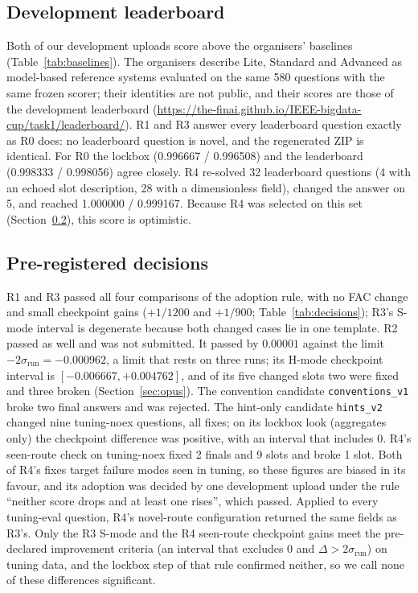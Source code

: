 \documentclass[conference]{IEEEtran}
\newcommand{\id}[1]{\texttt{#1}}
\begin{document}
\subsection{Development leaderboard}
Both of our development uploads score above the organisers' baselines (Table~\ref{tab:baselines}). The organisers describe Lite, Standard and Advanced as model-based reference systems evaluated on the same 580 questions with the same frozen scorer; their identities are not public, and their scores are those of the development leaderboard (\url{https://the-finai.github.io/IEEE-bigdata-cup/task1/leaderboard/}). R1 and R3 answer every leaderboard question exactly as R0 does: no leaderboard question is novel, and the regenerated ZIP is identical. For R0 the lockbox (0.996667 / 0.996508) and the leaderboard (0.998333 / 0.998056) agree closely. R4 re-solved 32 leaderboard questions (4 with an echoed slot description, 28 with a dimensionless field), changed the answer on 5, and reached 1.000000 / 0.999167. Because R4 was selected on this set (Section~\ref{sec:decisions}), this score is optimistic.

\subsection{Pre-registered decisions}\label{sec:decisions}
R1 and R3 passed all four comparisons of the adoption rule, with no FAC change and small checkpoint gains ($+1/1200$ and $+1/900$; Table~\ref{tab:decisions}); R3's S-mode interval is degenerate because both changed cases lie in one template. R2 passed as well and was not submitted. It passed by $0.00001$ against the limit $-2\sigma_{\mathrm{run}}=-0.000962$, a limit that rests on three runs; its H-mode checkpoint interval is $[-0.006667,+0.004762]$, and of its five changed slots two were fixed and three broken (Section~\ref{sec:opus}). The convention candidate \id{conventions\_v1} broke two final answers and was rejected. The hint-only candidate \id{hints\_v2} changed nine tuning-noex questions, all fixes; on its lockbox look (aggregates only) the checkpoint difference was positive, with an interval that includes 0. R4's seen-route check on tuning-noex fixed 2 finals and 9 slots and broke 1 slot. Both of R4's fixes target failure modes seen in tuning, so these figures are biased in its favour, and its adoption was decided by one development upload under the rule ``neither score drops and at least one rises'', which passed. Applied to every tuning-eval question, R4's novel-route configuration returned the same fields as R3's. Only the R3 S-mode and the R4 seen-route checkpoint gains meet the pre-declared improvement criteria (an interval that excludes 0 and $\Delta>2\sigma_{\mathrm{run}}$) on tuning data, and the lockbox step of that rule confirmed neither, so we call none of these differences significant.
\end{document}
